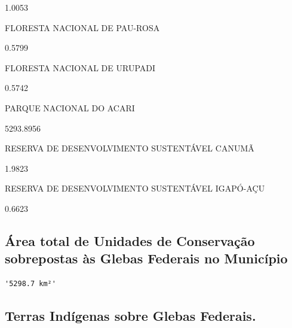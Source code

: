 \documentclass[
  letterpaper,
]{report}
\begin{document}
1.0053

\n    

\n    

\n      

FLORESTA NACIONAL DE PAU-ROSA

\n      

0.5799

\n    

\n    

\n      

FLORESTA NACIONAL DE URUPADI

\n      

0.5742

\n    

\n    

\n      

PARQUE NACIONAL DO ACARI

\n      

5293.8956

\n    

\n    

\n      

RESERVA DE DESENVOLVIMENTO SUSTENTÁVEL CANUMÃ

\n      

1.9823

\n    

\n    

\n      

RESERVA DE DESENVOLVIMENTO SUSTENTÁVEL IGAPÓ-AÇU

\n      

0.6623

\n    

\n  

\n

\hypertarget{uxe1rea-total-de-unidades-de-conservauxe7uxe3o-sobrepostas-uxe0s-glebas-federais-no-municuxedpio-1}{%
\subsection{Área total de Unidades de Conservação sobrepostas às Glebas
Federais no
Município}\label{uxe1rea-total-de-unidades-de-conservauxe7uxe3o-sobrepostas-uxe0s-glebas-federais-no-municuxedpio-1}}

\begin{verbatim}
'5298.7 km²'
\end{verbatim}

\hypertarget{terras-induxedgenas-sobre-glebas-federais.-1}{%
\subsection{Terras Indígenas sobre Glebas
Federais.}\label{terras-induxedgenas-sobre-glebas-federais.-1}}
\end{document}
